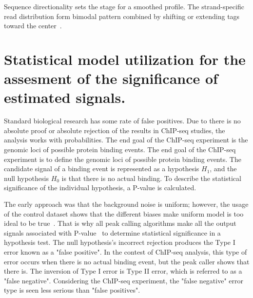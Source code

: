 Sequence directionality sets the stage for a smoothed profile. 
The strand-specific read distribution form bimodal pattern combined by shifting or extending tags toward the center~\cite{valouev2008genome}.



\section{Statistical model utilization for the assesment of the significance of estimated signals.}


Standard biological research has some rate of false positives. 
Due to there is no absolute proof or absolute rejection of the results in ChIP-seq studies, the analysis works with probabilities.
The end goal of the ChIP-seq experiment is the genomic loci of possible protein binding events. 
The end goal of the ChIP-seq experiment is to define the genomic loci of possible protein binding events. 
The candidate signal of a binding event is represented as a hypothesis $H_{1}$, and the null hypothesis $H_{0}$ is that there is no actual binding. To describe the statistical significance of the individual hypothesis, a P-value is calculated. 

The early approach was that the background noise is uniform; 
however, the usage of the control dataset shows that the different biases make uniform model is too ideal to be true~\cite{robertson2007genome}. 
That is why all peak calling algorithms make all the output signals associated with P-value~\cite{chitpin2019recap} to determine statistical significance in a hypothesis test. 
The null hypothesis's incorrect rejection produces the Type I error known as a "false positive". 
In the contest of ChIP-seq analysis, this type of error occurs when there is no actual binding event, but the peak caller shows that there is. 
The inversion of Type I error is Type II error, which is referred to as a "false negative". 
Considering the ChIP-seq experiment, the "false negative" error type is seen less serious than "false positives". 

